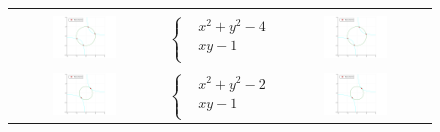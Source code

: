 \documentclass[a4paper]{article}
\theoremstyle{definition}
\theoremstyle{definition}
\theoremstyle{remark}
\theoremstyle{definition}
\begin{document}
\begin{figure}[htb]
\begin{tabular}{c c c}
        \vspace{0.5cm} \\
        \includegraphics[width=0.45\textwidth,valign=c]{../plots/solutions3.png} &
        $\left\{\begin{aligned}
                    &x^2 + y^2 - 4 \\
                    &xy - 1 \\
        \end{aligned}\right.$ &
        \includegraphics[width=0.45\textwidth,valign=c]{../plots/solutions3_6.png} \\
        \vspace{0.5cm} \\
        \includegraphics[width=0.45\textwidth,valign=c]{../plots/solutions4.png} &
        $\left\{\begin{aligned}
                    &x^2 + y^2 - 2 \\
                    &xy - 1 \\
        \end{aligned}\right.$ &
        \includegraphics[width=0.45\textwidth,valign=c]{../plots/solutions4_6.png} \\
    \end{tabular}
\end{figure}
\end{document}
